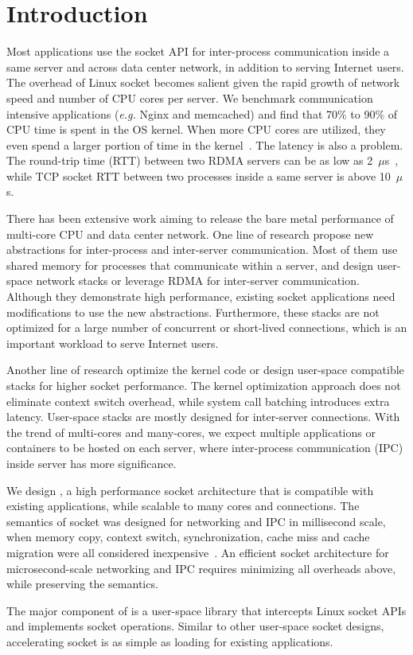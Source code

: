\section{Introduction}
\label{sec:intro}

Most applications use the socket API for inter-process communication inside a same server and across data center network, in addition to serving Internet users. The overhead of Linux socket becomes salient given the rapid growth of network speed and number of CPU cores per server. We benchmark communication intensive applications (\textit{e.g.} Nginx and memcached) and find that 70\% to 90\% of CPU time is spent in the OS kernel. When more CPU cores are utilized, they even spend a larger portion of time in the kernel~\cite{boyd2010analysis}. The latency is also a problem. The round-trip time (RTT) between two RDMA servers can be as low as 2~$\mu$s~\cite{kaminsky2016design}, while TCP socket RTT between two processes inside a same server is above 10~$\mu$s.

There has been extensive work aiming to release the bare metal performance of multi-core CPU and data center network. One line of research propose new abstractions for inter-process and inter-server communication. Most of them use shared memory for processes that communicate within a server, and design user-space network stacks or leverage RDMA for inter-server communication. Although they demonstrate high performance, existing socket applications need modifications to use the new abstractions. Furthermore, these stacks are not optimized for a large number of concurrent or short-lived connections, which is an important workload to serve Internet users.

Another line of research optimize the kernel code or design user-space compatible stacks for higher socket performance. The kernel optimization approach does not eliminate context switch overhead, while system call batching introduces extra latency. User-space stacks are mostly designed for inter-server connections. With the trend of multi-cores and many-cores, we expect multiple applications or containers to be hosted on each server, where inter-process communication (IPC) inside server has more significance.

We design \sys{}, a high performance socket architecture that is compatible with existing applications, while scalable to many cores and connections. The semantics of socket was designed for networking and IPC in millisecond scale, when memory copy, context switch, synchronization, cache miss and cache migration were all considered inexpensive~\cite{barroso2017attack}. An efficient socket architecture for microsecond-scale networking and IPC requires minimizing all overheads above, while preserving the semantics.


The major component of \sys{} is a user-space library \libipc{} that intercepts Linux socket APIs and implements socket operations. Similar to other user-space socket designs, accelerating socket is as simple as loading \libipc{} for existing applications.